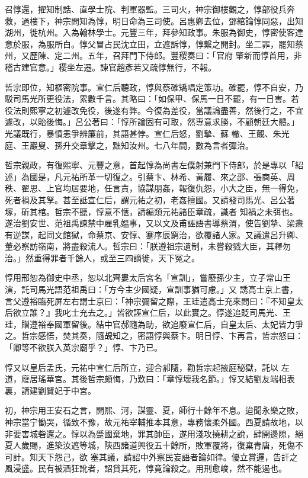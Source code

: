 \begin{pinyinscope}
 召惇還，擢知制誥、直學士院、判軍器監。三司火，神宗御樓觀之，惇部役兵奔救，過樓下，神宗問知為惇，明日命為三司使。呂惠卿去位，鄧綰論惇同惡，出知湖州，徙杭州。入為翰林學士。元豐三年，拜參知政事。朱服為御史，惇密使客達意於服，為服所白。惇父冒占民沈立田，立遮訴惇，惇繫之開封。坐二罪，罷知蔡州，又歷陳、定二州。五年，召拜門下侍郎。豐稷奏曰：「官府
 肇新而惇首用，非稽古建官意。」稷坐左遷。諫官趙彥若又疏惇無行，不報。



 哲宗即位，知樞密院事。宣仁后聽政，惇與蔡確矯唱定策功。確罷，惇不自安，乃駁司馬光所更役法，累數千言。其略曰：「如保甲、保馬一日不罷，有一日害。若役法則熙寧之初遽改免役，後遂有弊。今復為差役，當議論盡善，然後行之，不宜遽改，以貽後悔。」呂公著曰：「惇所論固有可取，然專意求勝，不顧朝廷大體。」光議既行，暴憤恚爭辨簾前，其語甚悖。宣仁后怒，劉摯、蘇
 轍、王覿、朱光庭、王巖叟、孫升交章擊之，黜知汝州。七八年間，數為言者彈治。



 哲宗親政，有復熙寧、元豐之意，首起惇為尚書左僕射兼門下侍郎，於是專以「紹述」為國是，凡元祐所革一切復之。引蔡卞、林希、黃履、來之邵、張商英、周秩、翟思、上官均居要地，任言責，協謀朋姦，報復仇怨，小大之臣，無一得免，死者禍及其孥。甚至詆宣仁后，謂元祐之初，老姦擅國。又請發司馬光、呂公著塚，斫其棺。哲宗不聽，惇意不愜，請編類元祐諸臣章疏，識者
 知禍之未弭也。遂治劉安世、范祖禹諫禁中雇乳媼事，又以文及甫誣語書導蔡渭，使告劉摯、梁燾有逆謀，起同文館獄，命蔡京、安惇、蹇序辰窮治，欲覆諸人家。又議遣呂升卿、董必察訪嶺南，將盡殺流人。哲宗曰：「朕遵祖宗遺制，未嘗殺戮大臣，其釋勿治。」然重得罪者千餘人，或至三四謫徙，天下冤之。



 惇用邢恕為御史中丞，恕以北齊婁太后宮名「宣訓」，嘗廢孫少主，立子常山王演，託司馬光語范祖禹曰：「方今主少國疑，宣訓事猶可慮。」又
 誘高士京上書，言父遵裕臨死屏左右謂士京曰：「神宗彌留之際，王珪遣高士充來問曰：『不知皇太后欲立誰？』我叱士充去之。」皆欲誣宣仁后，以此實之。惇遂追貶司馬光、王珪，贈遵裕奉國軍留後。結中官郝隨為助，欲追廢宣仁后，自皇太后、太妃皆力爭之。哲宗感悟，焚其奏，隨覘知之，密語惇與蔡卞。明日惇、卞再言，哲宗怒曰：「卿等不欲朕入英宗廟乎？」惇、卞乃已。



 惇又以皇后孟氏，元祐中宣仁后所立，迎合郝隨，勸哲宗起掖庭秘獄，託以
 左道，廢居瑤華宮。其後哲宗頗悔，乃歎曰：「章惇壞我名節。」惇又結劉友端相表裏，請建劉賢妃于中宮。



 初，神宗用王安石之言，開熙、河，謀靈、夏，師行十餘年不息。迨聞永樂之敗，神宗當宁慟哭，循致不豫，故元祐宰輔推本其意，專務懷柔外國。西夏請故地，以非要害城砦還之。惇以為蹙國棄地，罪其帥臣，遂用淺攻撓耕之說，肆開邊隙，絕夏人歲賜，進築汝遮等城，陝西諸道興役五十餘所，敗軍覆將，復棄青唐，死傷不可計。知天下怨己，欲
 塞其議，請詔中外察民妄語者論如律。優立賞邏，告訐之風浸盛。民有被酒狂訛者，詔貸其死，惇竟論殺之。用刑愈峻，然不能遏也。




\end{pinyinscope}
